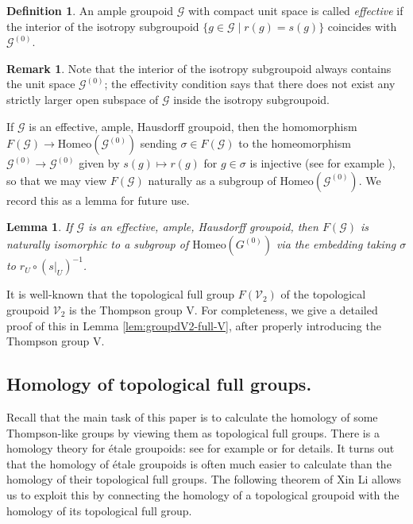 \documentclass[10pt,a4paper]{amsart}
\numberwithin{equation}{section}
\numberwithin{figure}{section}
\newtheorem{lem}[thm]{Lemma}
\theoremstyle{definition}
\newtheorem{rem}[thm]{Remark}
\newtheorem{defn}[thm]{Definition}
\newcommand{\cG}{\mathcal{G}}
\newcommand{\cV}{\mathcal{V}}
\newcommand{\V}{\mathrm{V}}
\begin{document}
\begin{defn}
\label{def:effective}
An ample groupoid $\cG$ with compact unit space is called \emph{effective} if the interior of the isotropy subgroupoid $\{g \in \cG\mid r(g) = s(g)\}$ coincides with $\cG^{(0)}$.
\end{defn}

\begin{rem}
Note that the interior of the isotropy subgroupoid always contains the unit space $\cG^{(0)}$; the effectivity condition says that there does not exist any strictly larger open subspace of $\cG$ inside the isotropy subgroupoid.
\end{rem}

If $\cG$ is an effective, ample, Hausdorff groupoid, then the homomorphism $F(\cG) \to \mathrm{Homeo}(\cG^{(0)})$ sending $\sigma \in F(\cG)$ to the homeomorphism $\cG^{(0)} \to \cG^{(0)}$ given by $s(g) \mapsto r(g)$ for $g \in \sigma$ is injective (see for example \cite[Lemma 3.1]{NylandOrtega2019}), so that we may view $F(\cG)$ naturally as a subgroup of $\mathrm{Homeo}(\cG^{(0)})$. We record this as a lemma for future use.

\begin{lem}
\label{lem:full-group-faithful}
If $\cG$ is an effective, ample, Hausdorff groupoid, then $F(\cG)$ is naturally isomorphic to a subgroup of $\mathrm{Homeo}(G^{(0)})$ via the embedding taking $\sigma$ to $r_U \circ (s|_U)^{-1}$.
\end{lem}

It is well-known that the topological full group $F(\cV_2)$ of the topological groupoid $\cV_2$ is the Thompson group $\V$. For completeness, we give a detailed proof of this in Lemma \ref{lem:groupdV2-full-V}, after properly introducing the Thompson group $\V$.


\subsection{Homology of topological full groups.}

Recall that the main task of this paper is to calculate the homology of some Thompson-like groups by viewing them as topological full groups. There is a homology theory for étale groupoids: see for example \cite{CrainicMoerdijk00} or \cite[\S 3]{Matui2012} for details. It turns out that the homology of étale groupoids is often much easier to calculate than the homology of their topological full groups. The following theorem of Xin Li allows us to exploit this by connecting the homology of a topological groupoid with the homology of its topological full group.
\end{document}
